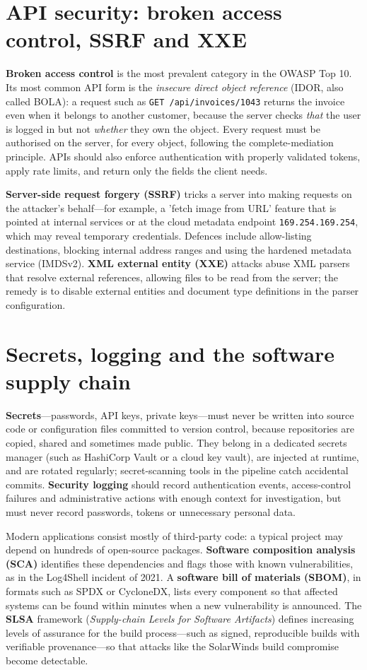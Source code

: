 \section{API security: broken access control, SSRF and XXE}\label{sec:9.5}
\textbf{Broken access control} is the most prevalent category in the OWASP Top 10. Its most common API form is the \emph{insecure direct object reference} (IDOR, also called BOLA): a request such as \texttt{GET /api/invoices/1043} returns the invoice even when it belongs to another customer, because the server checks \emph{that} the user is logged in but not \emph{whether} they own the object. Every request must be authorised on the server, for every object, following the complete-mediation principle. APIs should also enforce authentication with properly validated tokens, apply rate limits, and return only the fields the client needs.

\textbf{Server-side request forgery (SSRF)} tricks a server into making requests on the attacker's behalf—for example, a 'fetch image from URL' feature that is pointed at internal services or at the cloud metadata endpoint \texttt{169.254.169.254}, which may reveal temporary credentials. Defences include allow-listing destinations, blocking internal address ranges and using the hardened metadata service (IMDSv2). \textbf{XML external entity (XXE)} attacks abuse XML parsers that resolve external references, allowing files to be read from the server; the remedy is to disable external entities and document type definitions in the parser configuration.

\section{Secrets, logging and the software supply chain}\label{sec:9.6}
\textbf{Secrets}—passwords, API keys, private keys—must never be written into source code or configuration files committed to version control, because repositories are copied, shared and sometimes made public. They belong in a dedicated secrets manager (such as HashiCorp Vault or a cloud key vault), are injected at runtime, and are rotated regularly; secret-scanning tools in the pipeline catch accidental commits. \textbf{Security logging} should record authentication events, access-control failures and administrative actions with enough context for investigation, but must never record passwords, tokens or unnecessary personal data.

Modern applications consist mostly of third-party code: a typical project may depend on hundreds of open-source packages. \textbf{Software composition analysis (SCA)} identifies these dependencies and flags those with known vulnerabilities, as in the Log4Shell incident of 2021. A \textbf{software bill of materials (SBOM)}, in formats such as SPDX or CycloneDX, lists every component so that affected systems can be found within minutes when a new vulnerability is announced. The \textbf{SLSA} framework (\emph{Supply-chain Levels for Software Artifacts}) defines increasing levels of assurance for the build process—such as signed, reproducible builds with verifiable provenance—so that attacks like the SolarWinds build compromise become detectable.

